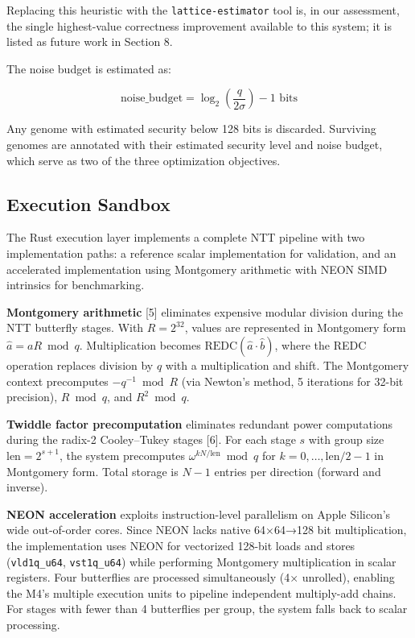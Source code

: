 Replacing this heuristic with the \texttt{lattice-estimator} tool is, in our assessment, the single highest-value correctness improvement available to this system; it is listed as future work in Section 8.

The noise budget is estimated as:

\[\text{noise\_budget} = \log_2\left(\frac{q}{2\sigma}\right) - 1 \text{ bits}\]

Any genome with estimated security below 128 bits is discarded. Surviving genomes are annotated with their estimated security level and noise budget, which serve as two of the three optimization objectives.

\subsection{Execution Sandbox}\label{execution-sandbox}

The Rust execution layer implements a complete NTT pipeline with two implementation paths: a reference scalar implementation for validation, and an accelerated implementation using Montgomery arithmetic with NEON SIMD intrinsics for benchmarking.

\textbf{Montgomery arithmetic} [5] eliminates expensive modular division during the NTT butterfly stages. With \(R = 2^{32}\), values are represented in Montgomery form \(\hat{a} = aR \bmod q\). Multiplication becomes \(\text{REDC}(\hat{a} \cdot \hat{b})\), where the REDC operation replaces division by \(q\) with a multiplication and shift. The Montgomery context precomputes \(-q^{-1} \bmod R\) (via Newton's method, 5 iterations for 32-bit precision), \(R \bmod q\), and \(R^2 \bmod q\).

\textbf{Twiddle factor precomputation} eliminates redundant power computations during the radix-2 Cooley--Tukey stages [6]. For each stage \(s\) with group size \(\text{len} = 2^{s+1}\), the system precomputes \(\omega^{kN/\text{len}} \bmod q\) for \(k = 0, \ldots, \text{len}/2 - 1\) in Montgomery form. Total storage is \(N - 1\) entries per direction (forward and inverse).

\textbf{NEON acceleration} exploits instruction-level parallelism on Apple Silicon's wide out-of-order cores. Since NEON lacks native 64×64→128 bit multiplication, the implementation uses NEON for vectorized 128-bit loads and stores (\texttt{vld1q\_u64}, \texttt{vst1q\_u64}) while performing Montgomery multiplication in scalar registers. Four butterflies are processed simultaneously (4× unrolled), enabling the M4's multiple execution units to pipeline independent multiply-add chains. For stages with fewer than 4 butterflies per group, the system falls back to scalar processing.

